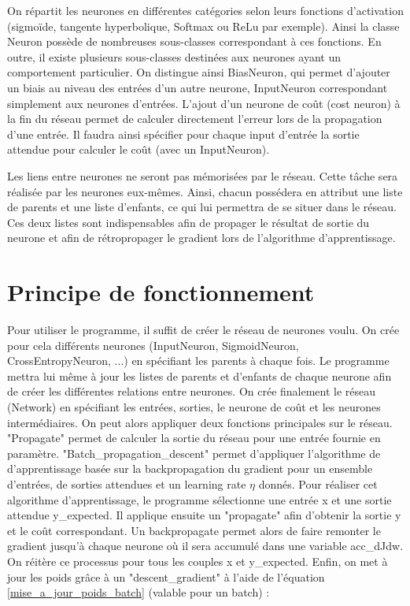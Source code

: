 \documentclass{report}
\begin{document}
On répartit les neurones en différentes catégories selon leurs fonctions d'activation (sigmoïde, tangente hyperbolique, Softmax ou ReLu par exemple).
Ainsi la classe Neuron possède de nombreuses sous-classes correspondant à ces fonctions. En outre, il existe plusieurs sous-classes destinées aux neurones ayant un comportement particulier. On distingue ainsi BiasNeuron, qui permet d'ajouter un biais au niveau des entrées d'un autre neurone, InputNeuron correspondant simplement aux neurones d'entrées. L'ajout d'un neurone de coût (cost neuron) à la fin du réseau permet de calculer directement l'erreur lors de la propagation d'une entrée. Il faudra ainsi spécifier pour chaque input d'entrée la sortie attendue pour calculer le coût (avec un InputNeuron).

Les liens entre neurones ne seront pas mémorisées par le réseau. Cette tâche sera réalisée par les neurones eux-mêmes. Ainsi, chacun possédera en attribut une liste de parents et une liste d'enfants, ce qui lui permettra de se situer dans le réseau. Ces deux listes sont indispensables afin de propager le résultat de sortie du neurone et afin de rétropropager le gradient lors de l'algorithme d'apprentissage.

\section{Principe de fonctionnement}
Pour utiliser le programme, il suffit de créer le réseau de neurones voulu. On crée pour cela différents neurones (InputNeuron, SigmoidNeuron, CrossEntropyNeuron, ...) en spécifiant les parents à chaque fois. Le programme mettra lui même à jour les listes de parents et d'enfants de chaque neurone afin de créer les différentes relations entre neurones. On crée finalement le réseau (Network) en spécifiant les entrées, sorties, le neurone de coût et les neurones intermédiaires.
On peut alors appliquer deux fonctions principales sur le réseau. "Propagate" permet de calculer la sortie du réseau pour une entrée fournie en paramètre. "Batch\_propagation\_descent" permet d'appliquer l'algorithme de d'apprentissage basée sur la backpropagation du gradient pour un ensemble d'entrées, de sorties attendues et un learning rate $\eta$ donnés. 
Pour réaliser cet algorithme d'apprentissage, le programme sélectionne une entrée x et une sortie attendue y\_expected. Il applique ensuite un "propagate" afin d'obtenir la sortie y et le coût correspondant. Un backpropagate permet alors de faire remonter le gradient jusqu'à chaque neurone où il sera accumulé dans une variable acc\_dJdw. On réitère ce processus pour tous les couples x et y\_expected. Enfin, on met à jour les poids grâce à un "descent\_gradient" à l'aide de l'équation \ref{mise_a_jour_poids_batch} (valable pour un batch) :
\end{document}
